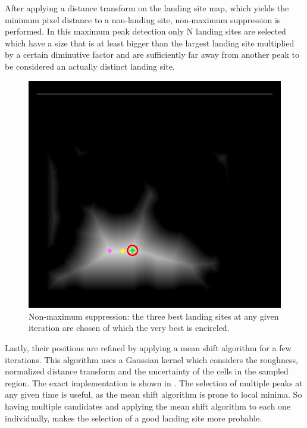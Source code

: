After applying a distance transform on the landing site map, which yields the minimum pixel distance to a non-landing site, non-maximum suppression is performed. In this maximum peak detection only N landing sites are selected which have a size that is at least bigger than the largest landing site multiplied by a certain diminutive factor and are sufficiently far away from another peak to be considered an actually distinct landing site.

\begin{figure}[ht!]
    \centering
    \includegraphics[scale=0.5]{images/system_overview/non_max_suppression.png}
    \caption{Non-maximum suppression: the three best landing sites at any given iteration are chosen of which the very best is encircled.}
    \label{fig:non_max_sup}
\end{figure}

Lastly, their positions are refined by applying a mean shift algorithm for a few iterations. This algorithm uses a Gaussian kernel which considers the roughness, normalized distance transform and the uncertainty of the cells in the sampled region. The exact implementation is shown in \citet{LSD2}. The selection of multiple peaks at any given time is useful, as the mean shift algorithm is prone to local minima. So having multiple candidates and applying the mean shift algorithm to each one individually, makes the selection of a good landing site more probable.

